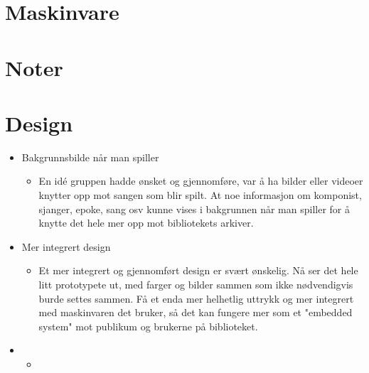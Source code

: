 \section{Maskinvare}



\section{Noter}

\section{Design}
\begin{itemize}

\item{Bakgrunnsbilde når man spiller}
\begin{itemize}
\item{En idé gruppen hadde ønsket og gjennomføre, var å ha bilder eller videoer knytter opp mot sangen som blir spilt. At noe informasjon om komponist, sjanger, epoke, sang osv kunne vises i bakgrunnen når man spiller for å knytte det hele mer opp mot bibliotekets arkiver.}
\end{itemize}

\item{Mer integrert design}
\begin{itemize}
\item{Et mer integrert og gjennomført design er svært ønskelig. Nå ser det hele litt prototypete ut, med farger og bilder sammen som ikke nødvendigvis burde settes sammen. Få et enda mer helhetlig uttrykk og mer integrert med maskinvaren det bruker, så det kan fungere mer som et "embedded system"\cite{embeddedSystem} mot publikum og brukerne på biblioteket.}
\end{itemize}

\item{}
\begin{itemize}
\item{}
\end{itemize}

\end{itemize}